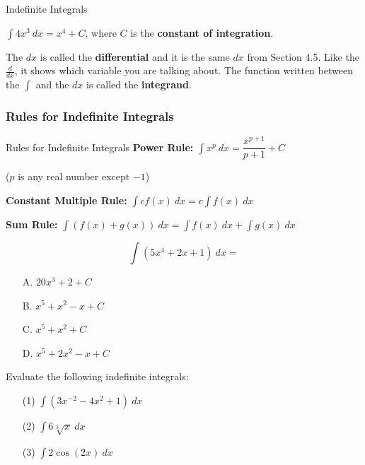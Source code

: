 \documentclass[cal1spr16Lectures.tex]{subfiles}
\begin{document}
\begin{frame}{\small Indefinite Integrals}\small
\begin{ex} $\int 4x^3\ dx = x^4+C$, where $C$ is the {\bf constant of integration}. \end{ex}

\vspace{1pc}
The $dx$ is called the {\bf differential} and it is the same $dx$ from Section 4.5.  Like the $\frac{d}{dx}$, it shows which variable you are talking about.  The function written between the $\int$ and the $dx$ is called the {\bf integrand}.
\end{frame}

\subsubsection{Rules for Indefinite Integrals}

\begin{frame}{\small Rules for Indefinite Integrals}\footnotesize
{\bf Power Rule:}  $\int x^p\ dx = \dfrac{x^{p+1}}{p+1} + C$ 

\vspace{0.65pc}
\hspace{5ex}($p$ is any real number except $-1$) 

\vspace{1.5pc}
{\bf Constant Multiple Rule:} $\int c f(x)\ dx = c \int f(x)\ dx$

\vspace{1.5pc}
{\bf Sum Rule:} $\int \left(f(x)+g(x) \right)\ dx = \int f(x)\ dx + \int g(x)\ dx$
\end{frame}

\begin{frame}
\begin{exe}
\[\int(5x^4+2x+1)\ dx=\]
\begin{itemize}
\item[A. ] $20x^3+2+C$
\item[B. ] $x^5+x^2-x+C$
\item[C. ] $x^5+x^2+C$
\item[D. ] $x^5+2x^2-x+C$
\end{itemize}
\end{exe}
\end{frame}

\begin{frame}
\begin{exe} Evaluate the following indefinite integrals:
\begin{itemize}
\item[(1) ] $\int \left( 3x^{-2}-4x^2+1 \right)\ dx$
\item[(2) ] $\int 6 \sqrt[3]{x}\ dx$
\item[(3) ] $\int 2 \cos{(2x)}\ dx$
\end{itemize}
\end{exe}
\end{frame}
\end{document}

